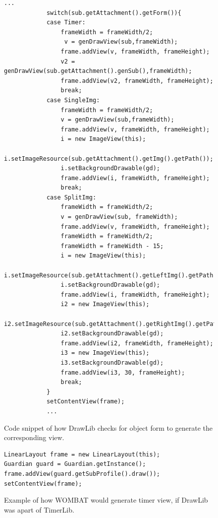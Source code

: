 \begin{figure}[H]
\begin{lstlisting}
...
			switch(sub.getAttachment().getForm()){
			case Timer:
				frameWidth = frameWidth/2;
				 v = genDrawView(sub,frameWidth);
				frame.addView(v, frameWidth, frameHeight);
				v2 = genDrawView(sub.getAttachment().genSub(),frameWidth);
				frame.addView(v2, frameWidth, frameHeight);
				break;
			case SingleImg:
				frameWidth = frameWidth/2;
				v = genDrawView(sub,frameWidth);
				frame.addView(v, frameWidth, frameHeight);
				i = new ImageView(this);
				i.setImageResource(sub.getAttachment().getImg().getPath());
				i.setBackgroundDrawable(gd);
				frame.addView(i, frameWidth, frameHeight);
				break;
			case SplitImg:
				frameWidth = frameWidth/2;
				v = genDrawView(sub, frameWidth);
				frame.addView(v, frameWidth, frameHeight);
				frameWidth = frameWidth/2;
				frameWidth = frameWidth - 15;
				i = new ImageView(this);
				i.setImageResource(sub.getAttachment().getLeftImg().getPath());
				i.setBackgroundDrawable(gd);
				frame.addView(i, frameWidth, frameHeight);
				i2 = new ImageView(this);
				i2.setImageResource(sub.getAttachment().getRightImg().getPath());
				i2.setBackgroundDrawable(gd);
				frame.addView(i2, frameWidth, frameHeight);
				i3 = new ImageView(this);
				i3.setBackgroundDrawable(gd);
				frame.addView(i3, 30, frameHeight);
				break;
			}
			setContentView(frame);	
			...
\end{lstlisting}
\caption{Code snippet of how DrawLib checks for object form to generate the corresponding view.}%
\label{code:drawlibnow}%
\end{figure}

\begin{figure}[H]
\begin{lstlisting}
LinearLayout frame = new LinearLayout(this);
Guardian guard = Guardian.getInstance();
frame.addView(guard.getSubProfile().draw());
setContentView(frame);	
\end{lstlisting}
\caption{Example of how WOMBAT would generate timer view, if DrawLib was apart of TimerLib.}%
\label{code:drawlibfuture}%
\end{figure}


